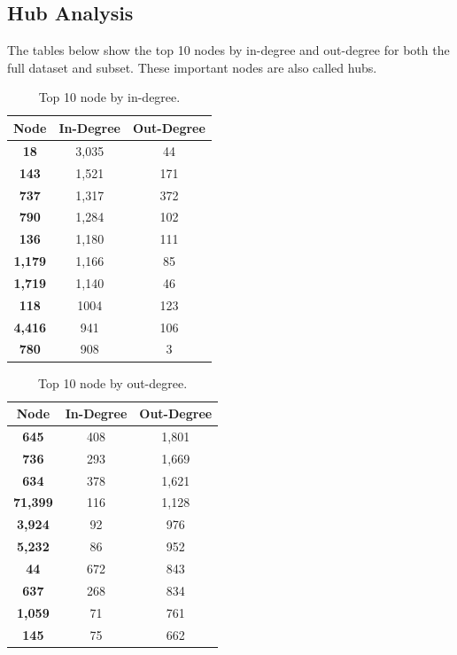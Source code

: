 \documentclass[conference]{IEEEtran}
\begin{document}
\subsection{Hub Analysis}
The tables below show the top 10 nodes by in-degree and out-degree for both the full dataset and subset. These important nodes are also called hubs. 

\begin{table}[h!]
\centering
\begin{tabular}{|c|c|c|}
\toprule
\textbf{Node} & \textbf{In-Degree} & \textbf{Out-Degree} \\
\midrule
\textbf{18} & 3,035 &  44 \\
\textbf{143} & 1,521 & 171 \\
\textbf{737} & 1,317 & 372 \\
\textbf{790} & 1,284 & 102 \\
\textbf{136} & 1,180 & 111 \\
\textbf{1,179} & 1,166 & 85 \\
\textbf{1,719} & 1,140 & 46 \\
\textbf{118} & 1004 & 123 \\
\textbf{4,416} & 941 & 106 \\
\textbf{780} & 908 & 3\\
\bottomrule
\end{tabular}
\caption{Top 10 node by in-degree.}
\label{tab:top_in_deg}
\end{table}

\begin{table}[h!]
\centering
\begin{tabular}{|c|c|c|}
\toprule
\textbf{Node} & \textbf{In-Degree} & \textbf{Out-Degree} \\
\midrule
\textbf{645} & 408 &  1,801 \\
\textbf{736} & 293 & 1,669 \\
\textbf{634} & 378 & 1,621 \\
\textbf{71,399} & 116 & 1,128 \\
\textbf{3,924} & 92 & 976 \\
\textbf{5,232} & 86 & 952 \\
\textbf{44} & 672 & 843 \\
\textbf{637} & 268 & 834 \\
\textbf{1,059} & 71 & 761 \\
\textbf{145} & 75 & 662\\
\bottomrule
\end{tabular}
\caption{Top 10 node by out-degree.}
\label{tab:top_out_deg}
\end{table}
\end{document}
